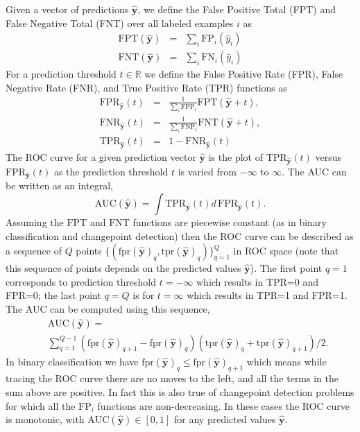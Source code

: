 \documentclass{article}
\begin{document}
Given a vector of predictions $\mathbf{\hat y}$, we define the False Positive Total (FPT) and False Negative Total (FNT) over all labeled examples $i$ as
\begin{eqnarray}
 \text{FPT}(\mathbf {\hat y}) &=&
 \sum_{i} \text{FP}_i(\hat y_i) \\
 \text{FNT}(\mathbf {\hat y}) &=&
 \sum_{i} \text{FN}_i(\hat y_i) 
\end{eqnarray}
For a prediction threshold $t\in\mathbb R$ we define the False Positive Rate (FPR), False Negative Rate (FNR), and True Positive Rate (TPR) functions as
\begin{eqnarray}
 \text{FPR}_{\mathbf {\hat y}}(t) &=&
 \frac{1}{\sum_i \text{FPP}_i } 
 \text{FPT}(\mathbf {\hat y}+t), \\
 \text{FNR}_{\mathbf {\hat y}}(t) &=&
 \frac{1}{\sum_i \text{FNP}_i } 
 \text{FNT}(\mathbf {\hat y}+t),\\
 \text{TPR}_{\mathbf {\hat y}}(t) &=&
 1 - \text{FNR}_{\mathbf {\hat y}}(t)
\end{eqnarray}
The ROC curve for a given prediction vector $\mathbf {\hat y}$ is the plot of $\text{TPR}_{\mathbf {\hat y}}(t) $ versus $\text{FPR}_{\mathbf {\hat y}}(t) $ as the prediction threshold $t$ is varied from $-\infty$ to $\infty$.
The AUC can be written as an integral,
\begin{equation}
    \text{AUC}(\mathbf{\hat y}) = 
    \int \text{TPR}_{\mathbf {\hat y}}(t) 
    d\, \text{FPR}_{\mathbf{\hat y}}(t).
\end{equation}
Assuming the $\text{FPT}$ and $\text{FNT}$ functions are piecewise constant (as in binary classification and changepoint detection) then the ROC curve can be described as a sequence of $Q$ points 
$\{(\text{fpr}
(\mathbf {\hat y})
_q, \text{tpr}
(\mathbf {\hat y})
_q)\}_{q=1}^Q$ in ROC space (note that this sequence of points depends on the predicted values $\mathbf {\hat y}$).
The first point $q=1$ corresponds to prediction threshold $t=-\infty$ which results in TPR=0 and FPR=0; the last point $q=Q$ is for $t=\infty$ which results in TPR=1 and FPR=1.
The AUC can be computed using this sequence,
\begin{eqnarray}
\label{eq:auc-seq}
&&\text{AUC}(\mathbf {\hat y}) = \\
  &&  \sum_{q=1}^{Q-1} 
    (\text{fpr}
    (\mathbf {\hat y})
    _{q+1} - \text{fpr}
    (\mathbf {\hat y})
    _q)
    (\text{tpr}
    (\mathbf {\hat y})
    _{q} + \text{tpr}
    (\mathbf {\hat y})
    _{q+1})/2.\nonumber
\end{eqnarray}
In binary classification we have $\text{fpr}(\mathbf {\hat y})_{q} \leq \text{fpr}(\mathbf {\hat y})_{q+1}$ which means while tracing the ROC curve there are no moves to the left, and all the terms in the sum above are positive.
In fact this is also true of changepoint detection problems for which all the $\text{FP}_i$ functions are non-decreasing. 
In these cases the ROC curve is monotonic, with $\text{AUC}(\mathbf {\hat y})\in[0,1]$ for any predicted values $\mathbf {\hat y}$.
\end{document}
